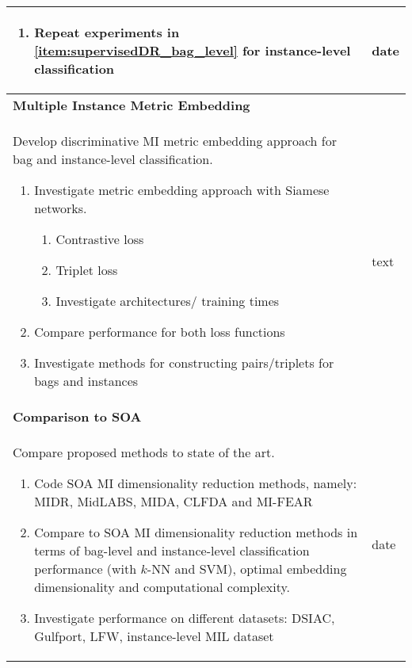 \begin{longtable}{|p{10cm}|p{4cm}|}
\begin{enumerate}
		\item Repeat experiments in \ref{item:supervisedDR_bag_level} for instance-level classification
	\end{enumerate} & date\\
	\hline
	\multicolumn{2}{|l|}{\textbf{Multiple Instance Metric Embedding}} \\
	\hline
	Develop discriminative MI metric embedding approach for bag and instance-level classification. 
	\begin{enumerate}
		\item Investigate metric embedding approach with Siamese networks.
		\begin{enumerate}
			\item Contrastive loss
			\item Triplet loss
			\item Investigate architectures/ training times
		\end{enumerate}
		\item Compare performance for both loss functions
		\item Investigate methods for constructing pairs/triplets for bags and instances 
	\end{enumerate} & text\\
	\hline
	\multicolumn{2}{|l|}{\textbf{Comparison to SOA}} \\
	\hline
	Compare proposed methods to state of the art.
	\begin{enumerate}
		\item Code SOA MI dimensionality reduction methods, namely: MIDR, MidLABS, MIDA, CLFDA and MI-FEAR
		\item Compare to SOA MI dimensionality reduction methods in terms of bag-level and instance-level classification performance (with $k$-NN and SVM), optimal embedding dimensionality and computational complexity.
		\item  Investigate performance on different datasets: DSIAC, Gulfport, LFW, instance-level MIL dataset
	\end{enumerate} & date\\

\end{longtable}

